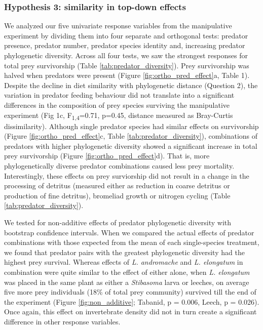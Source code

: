 \subsubsection{Hypothesis 3: similarity in top-down
effects}\label{hypothesis-3-similarity-in-top-down-effects}

We analyzed our five univariate response variables from the manipulative
experiment by dividing them into four separate and orthogonal tests:
predator presence, predator number, predator species identity and,
increasing predator phylogenetic diversity. Across all four tests, we
saw the strongest responses for total prey survivorship (Table \ref{tab:predator_diversity}). Prey
survivorship was halved when predators were present (Figure \ref{fig:ortho_pred_effect}a, Table
1). Despite the decline in diet similarity with phylogenetic distance
(Question 2), the variation in predator feeding behaviour did not
translate into a significant differences in the composition of prey
species surviving the manipulative experiment (Fig 1c,
F\textsubscript{1,4}=0.71, p=0.45, distance measured as Bray-Curtis
dissimilarity). Although single predator species had similar effects on
survivorship (Figure \ref{fig:ortho_pred_effect}c, Table \ref{tab:predator_diversity}), combinations of predators with higher
phylogenetic diversity showed a significant increase in total prey
survivorship (Figure \ref{fig:ortho_pred_effect}d). That is, more phylogenetically diverse predator
combinations caused less prey mortality. Interestingly, these effects on
prey surviorship did not result in a change in the processing of
detritus (measured either as reduction in coarse detritus or production
of fine detritus), bromeliad growth or nitrogen cycling (Table \ref{tab:predator_diversity}).

We tested for non-additive effects of predator phylogenetic diversity
with bootstrap confidence intervals. When we compared the actual effects
of predator combinations with those expected from the mean of each
single-species treatment, we found that predator pairs with the greatest
phylogenetic diversity had the highest prey survival. Whereas effects of
\emph{L. andromache} and \emph{L. elongatum} in combination were quite
similar to the effect of either alone, when \emph{L. elongatum} was
placed in the same plant as either a \emph{Stibasoma} larva or leeches,
on average five more prey individuals (18\% of total prey community)
survived till the end of the experiment (Figure \ref{fig:non_additive}; Tabanid, p = 0.006,
Leech, p = 0.026). Once again, this effect on invertebrate density did
not in turn create a significant difference in other response variables.

